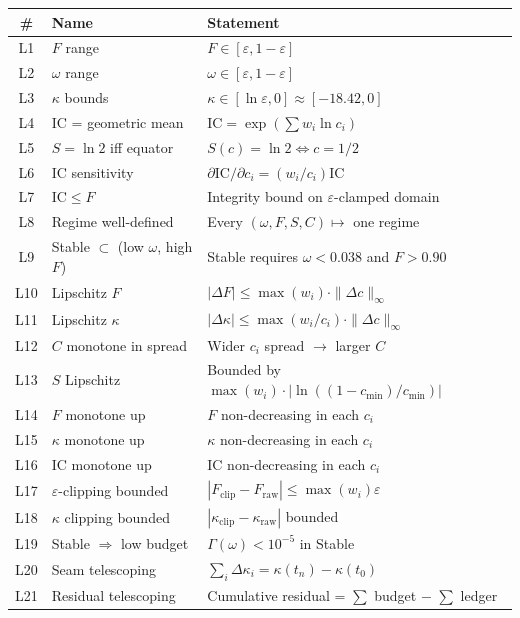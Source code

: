 \documentclass[
  aps,
  prd,
  twocolumn,
  superscriptaddress,
  nofootinbib,
  floatfix
]{revtex4-2}
\newcommand{\Gam}{\Gamma}
\newcommand{\eps}{\varepsilon}
\newcommand{\IC}{\mathrm{IC}}
\begin{document}
{\small
\begin{center}
\begin{tabular}{@{}clP{3.5cm}@{}}
\toprule
\# & Name & Statement \\
\midrule
L1 & $F$ range &
  $F \in [\eps, 1{-}\eps]$ \\
L2 & $\omega$ range &
  $\omega \in [\eps, 1{-}\eps]$ \\
L3 & $\kappa$ bounds &
  $\kappa \in [\ln\eps, 0] \approx [-18.42, 0]$ \\
L4 & IC = geometric mean &
  $\IC = \exp(\sum w_i \ln c_i)$ \\
L5 & $S = \ln 2$ iff equator &
  $S(c) = \ln 2 \Leftrightarrow c = 1/2$ \\
L6 & IC sensitivity &
  $\partial\IC/\partial c_i = (w_i/c_i)\IC$ \\
L7 & $\IC \leq F$ &
  Integrity bound on $\eps$-clamped domain \\
L8 & Regime well-defined &
  Every $(\omega,F,S,C) \mapsto$ one regime \\
L9 & Stable $\subset$ (low $\omega$, high $F$) &
  Stable requires $\omega < 0.038$ and $F > 0.90$ \\
L10 & Lipschitz $F$ &
  $|\Delta F| \leq \max(w_i) \cdot \|\Delta c\|_\infty$ \\
L11 & Lipschitz $\kappa$ &
  $|\Delta\kappa| \leq \max(w_i/c_i) \cdot \|\Delta c\|_\infty$ \\
L12 & $C$ monotone in spread &
  Wider $c_i$ spread $\to$ larger $C$ \\
L13 & $S$ Lipschitz &
  Bounded by $\max(w_i) \cdot |\ln((1{-}c_{\min})/c_{\min})|$ \\
L14 & $F$ monotone up &
  $F$ non-decreasing in each $c_i$ \\
L15 & $\kappa$ monotone up &
  $\kappa$ non-decreasing in each $c_i$ \\
L16 & $\IC$ monotone up &
  $\IC$ non-decreasing in each $c_i$ \\
L17 & $\eps$-clipping bounded &
  $|F_\mathrm{clip} - F_\mathrm{raw}|
  \leq \max(w_i)\eps$ \\
L18 & $\kappa$ clipping bounded &
  $|\kappa_\mathrm{clip} - \kappa_\mathrm{raw}|$ bounded \\
L19 & Stable $\Rightarrow$ low budget &
  $\Gam(\omega) < 10^{-5}$ in Stable \\
L20 & Seam telescoping &
  $\sum_i \Delta\kappa_i = \kappa(t_n) - \kappa(t_0)$ \\
L21 & Residual telescoping &
  Cumulative residual = $\sum$ budget $-$ $\sum$ ledger \\

\end{tabular}
\end{center}}
\end{document}
